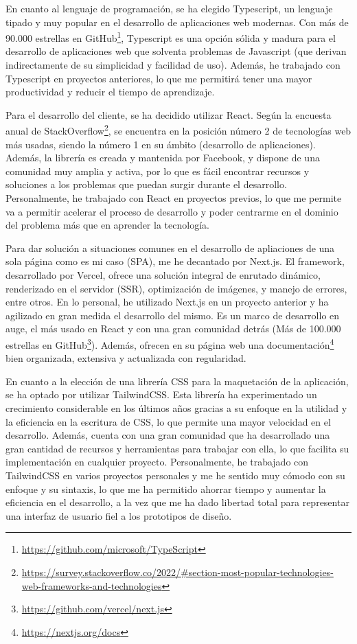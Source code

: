 En cuanto al lenguaje de programación, se ha elegido Typescript, un lenguaje tipado y muy popular en el desarrollo de aplicaciones web modernas. Con más de 90.000 estrellas en GitHub\footnote{\url{https://github.com/microsoft/TypeScript}}, Typescript es una opción sólida y madura para el desarrollo de aplicaciones web que solventa problemas de Javascript (que derivan indirectamente de su simplicidad y facilidad de uso). Además, he trabajado con Typescript en proyectos anteriores, lo que me permitirá tener una mayor productividad y reducir el tiempo de aprendizaje.

Para el desarrollo del cliente, se ha decidido utilizar React. Según la encuesta anual de StackOverflow\footnote{\url{https://survey.stackoverflow.co/2022/\#section-most-popular-technologies-web-frameworks-and-technologies}}, se encuentra en la posición número 2 de tecnologías web más usadas, siendo la número 1 en su ámbito (desarrollo de aplicaciones). Además, la librería es creada y mantenida por Facebook, y dispone de una comunidad muy amplia y activa, por lo que es fácil encontrar recursos y soluciones a los problemas que puedan surgir durante el desarrollo. Personalmente, he trabajado con React en proyectos previos, lo que me permite va a permitir acelerar el proceso de desarrollo y poder centrarme en el dominio del problema más que en aprender la tecnología.

Para dar solución a situaciones comunes en el desarrollo de apliaciones de una sola página como es mi caso (SPA), me he decantado por Next.js. El framework, desarrollado por Vercel, ofrece una solución integral de enrutado dinámico, renderizado en el servidor (SSR), optimización de imágenes, y manejo de errores,  entre otros. En lo personal, he utilizado Next.js en un proyecto anterior y ha agilizado en gran medida el desarrollo del mismo. Es un marco de desarrollo en auge, el más usado en React y con una gran comunidad detrás (Más de 100.000 estrellas en GitHub\footnote{\url{https://github.com/vercel/next.js}}). Además, ofrecen en su página web una documentación\footnote{\url{https://nextjs.org/docs}} bien organizada, extensiva y actualizada con regularidad.

En cuanto a la elección de una librería CSS para la maquetación de la aplicación, se ha optado por utilizar TailwindCSS. Esta librería ha experimentado un crecimiento considerable en los últimos años gracias a su enfoque en la utilidad y la eficiencia en la escritura de CSS, lo que permite una mayor velocidad en el desarrollo. Además, cuenta con una gran comunidad que ha desarrollado una gran cantidad de recursos y herramientas para trabajar con ella, lo que facilita su implementación en cualquier proyecto. Personalmente, he trabajado con TailwindCSS en varios proyectos personales y me he sentido muy cómodo con su enfoque y su sintaxis, lo que me ha permitido ahorrar tiempo y aumentar la eficiencia en el desarrollo, a la vez que me ha dado libertad total para representar una interfaz de usuario fiel a los prototipos de diseño.

